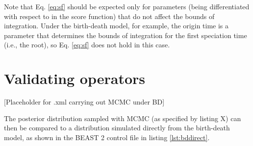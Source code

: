 \documentclass[oneside]{article}
\begin{document}
Note that Eq. \ref{eq:sf} should be expected only for parameters
(being differentiated with respect to in the score function) that
do not affect the bounds of integration.
Under the birth-death model, for example, the origin time is a parameter
that determines the bounds of integration for the first speciation
time (i.e., the root), so Eq. \ref{eq:sf} does not hold in this case.

\section*{Validating operators}

[Placeholder for .xml carrying out MCMC under BD]

The posterior distribution sampled with MCMC (as specified by listing X)
can then be compared to a distribution simulated directly from the
birth-death model, as shown in the BEAST 2 control file in listing \ref{lst:bddirect}.
\end{document}
